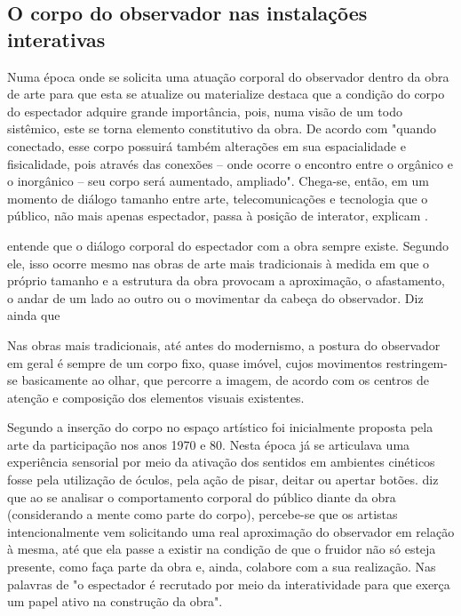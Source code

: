 \subsection{O corpo do observador nas instalações interativas}
	
Numa época onde se solicita uma atuação corporal do observador dentro da obra de arte para que esta se atualize ou materialize  destaca que a condição do corpo do espectador adquire grande importância, pois, numa visão de um todo sistêmico, este se torna elemento constitutivo da obra. De acordo com  "quando conectado, esse corpo possuirá também alterações em sua espacialidade e fisicalidade, pois através das conexões – onde ocorre o encontro entre o orgânico e o inorgânico – seu corpo será aumentado, ampliado". Chega-se, então, em um momento de diálogo tamanho entre arte, telecomunicações e tecnologia que o público, não mais apenas espectador, passa à posição de interator, explicam . 

 entende que o diálogo corporal do espectador com a obra sempre existe. Segundo ele, isso ocorre mesmo nas obras de arte mais tradicionais à medida em que o próprio tamanho e a estrutura da obra provocam a aproximação, o afastamento, o andar de um lado ao outro ou o movimentar da cabeça do observador. Diz ainda que

\begin{citacao}
Nas obras mais tradicionais, até antes do modernismo, a postura do observador em geral é sempre de um corpo fixo, quase imóvel, cujos movimentos restringem-se basicamente ao olhar, que percorre a imagem, de acordo com os centros de atenção e composição dos elementos visuais existentes. \cite[p. 1585]{sogabe} 
\end{citacao}

Segundo  a inserção do corpo no espaço artístico foi inicialmente proposta pela arte da participação nos anos 1970 e 80. Nesta época já se articulava uma experiência sensorial por meio da ativação dos sentidos em ambientes cinéticos fosse pela utilização de óculos, pela ação de pisar, deitar ou apertar botões.  diz que ao se analisar o comportamento corporal do público diante da obra (considerando a mente como parte do corpo), percebe-se que os artistas intencionalmente vem solicitando uma real aproximação do observador em relação à mesma, até que ela passe a existir na condição de que o fruidor não só esteja presente, como faça parte da obra e, ainda, colabore com a sua realização. Nas palavras de  "o espectador é recrutado por meio da interatividade para que exerça um papel ativo na construção da obra".

